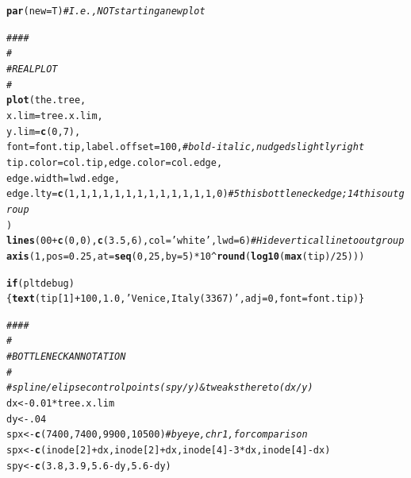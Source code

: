 \documentclass{article}\usepackage[]{graphicx}\usepackage[]{color}
\makeatletter
\newcommand{\hlnum}[1]{\textcolor[rgb]{0.686,0.059,0.569}{#1}}%
\newcommand{\hlstr}[1]{\textcolor[rgb]{0.192,0.494,0.8}{#1}}%
\newcommand{\hlcom}[1]{\textcolor[rgb]{0.678,0.584,0.686}{\textit{#1}}}%
\newcommand{\hlopt}[1]{\textcolor[rgb]{0,0,0}{#1}}%
\newcommand{\hlstd}[1]{\textcolor[rgb]{0.345,0.345,0.345}{#1}}%
\newcommand{\hlkwa}[1]{\textcolor[rgb]{0.161,0.373,0.58}{\textbf{#1}}}%
\newcommand{\hlkwb}[1]{\textcolor[rgb]{0.69,0.353,0.396}{#1}}%
\newcommand{\hlkwc}[1]{\textcolor[rgb]{0.333,0.667,0.333}{#1}}%
\newcommand{\hlkwd}[1]{\textcolor[rgb]{0.737,0.353,0.396}{\textbf{#1}}}%
\newenvironment{kframe}{%
 \def\at@end@of@kframe{}%
 \ifinner\ifhmode%
  \def\at@end@of@kframe{\end{minipage}}%
  \begin{minipage}{\columnwidth}%
 \fi\fi%
 \def\FrameCommand##1{\hskip\@totalleftmargin \hskip-\fboxsep
 \colorbox{shadecolor}{##1}\hskip-\fboxsep
     \hskip-\linewidth \hskip-\@totalleftmargin \hskip\columnwidth}%
 \MakeFramed {\advance\hsize-\width
   \@totalleftmargin\z@ \linewidth\hsize
   \@setminipage}}%
 {\par\unskip\endMakeFramed%
 \at@end@of@kframe}
\newenvironment{knitrout}{}{} %
\makeatother
\begin{document}
\begin{knitrout}
\begin{kframe}
\begin{alltt}
  \hlkwd{par}\hlstd{(}\hlkwc{new}\hlstd{=T)}  \hlcom{# I.e., NOT starting a new plot}

  \hlcom{####}
  \hlcom{#}
  \hlcom{# REAL PLOT}
  \hlcom{#}
  \hlkwd{plot}\hlstd{(the.tree,}
       \hlkwc{x.lim} \hlstd{= tree.x.lim,}
       \hlkwc{y.lim} \hlstd{=} \hlkwd{c}\hlstd{(}\hlnum{0}\hlstd{,}\hlnum{7}\hlstd{),}
       \hlkwc{font}\hlstd{=font.tip,} \hlkwc{label.offset}\hlstd{=}\hlnum{100}\hlstd{,}             \hlcom{# bold-italic, nudged slightly right}
       \hlkwc{tip.color}\hlstd{=col.tip,} \hlkwc{edge.color}\hlstd{=col.edge,}
       \hlkwc{edge.width}\hlstd{=lwd.edge,}
       \hlkwc{edge.lty}\hlstd{=}\hlkwd{c}\hlstd{(}\hlnum{1}\hlstd{,}\hlnum{1}\hlstd{,}\hlnum{1}\hlstd{,}\hlnum{1}\hlstd{,} \hlnum{1} \hlstd{,}\hlnum{1}\hlstd{,}\hlnum{1}\hlstd{,}\hlnum{1}\hlstd{,}\hlnum{1}\hlstd{,}\hlnum{1}\hlstd{,}\hlnum{1}\hlstd{,}\hlnum{1}\hlstd{,}\hlnum{1}\hlstd{,}\hlnum{0}\hlstd{)}    \hlcom{# 5th is bottleneck edge; 14th is outgroup}
      \hlstd{)}
  \hlkwd{lines}\hlstd{(}\hlnum{00}\hlopt{+}\hlkwd{c}\hlstd{(}\hlnum{0}\hlstd{,}\hlnum{0}\hlstd{),}\hlkwd{c}\hlstd{(}\hlnum{3.5}\hlstd{,}\hlnum{6}\hlstd{),}\hlkwc{col}\hlstd{=}\hlstr{'white'}\hlstd{,}\hlkwc{lwd}\hlstd{=}\hlnum{6}\hlstd{)}       \hlcom{# Hide vertical line to outgroup}
  \hlkwd{axis}\hlstd{(}\hlnum{1}\hlstd{,} \hlkwc{pos}\hlstd{=}\hlnum{0.25}\hlstd{,} \hlkwc{at}\hlstd{=}\hlkwd{seq}\hlstd{(}\hlnum{0}\hlstd{,}\hlnum{25}\hlstd{,}\hlkwc{by}\hlstd{=}\hlnum{5}\hlstd{)}\hlopt{*}\hlnum{10}\hlopt{^}\hlkwd{round}\hlstd{(}\hlkwd{log10}\hlstd{(}\hlkwd{max}\hlstd{(tip)}\hlopt{/}\hlnum{25}\hlstd{)))}

  \hlkwa{if}\hlstd{(pltdebug)\{}\hlkwd{text}\hlstd{(tip[}\hlnum{1}\hlstd{]}\hlopt{+}\hlnum{100}\hlstd{,} \hlnum{1.0}\hlstd{,} \hlstr{'Venice, Italy (3367)'}\hlstd{,} \hlkwc{adj}\hlstd{=}\hlnum{0}\hlstd{,} \hlkwc{font}\hlstd{=font.tip)\}}

  \hlcom{####}
  \hlcom{#}
  \hlcom{# BOTTLENECK ANNOTATION}
  \hlcom{#}
  \hlcom{# spline/elipse control points (spy/y) & tweaks thereto (dx/y)}
  \hlstd{dx} \hlkwb{<-} \hlnum{0.01} \hlopt{*} \hlstd{tree.x.lim}
  \hlstd{dy} \hlkwb{<-} \hlnum{.04}
  \hlstd{spx} \hlkwb{<-} \hlkwd{c}\hlstd{(}\hlnum{7400}\hlstd{,} \hlnum{7400}\hlstd{,} \hlnum{9900}\hlstd{,} \hlnum{10500}\hlstd{)} \hlcom{# by eye, chr1, for comparison}
  \hlstd{spx} \hlkwb{<-} \hlkwd{c}\hlstd{(inode[}\hlnum{2}\hlstd{]}\hlopt{+}\hlstd{dx,inode[}\hlnum{2}\hlstd{]}\hlopt{+}\hlstd{dx,inode[}\hlnum{4}\hlstd{]}\hlopt{-}\hlnum{3}\hlopt{*}\hlstd{dx,inode[}\hlnum{4}\hlstd{]}\hlopt{-}\hlstd{dx)}
  \hlstd{spy} \hlkwb{<-} \hlkwd{c}\hlstd{(} \hlnum{3.8}\hlstd{,}  \hlnum{3.9}\hlstd{,}  \hlnum{5.6}\hlopt{-}\hlstd{dy,}   \hlnum{5.6}\hlopt{-}\hlstd{dy)}


\end{alltt}
\end{kframe}
\end{knitrout}
\end{document}

